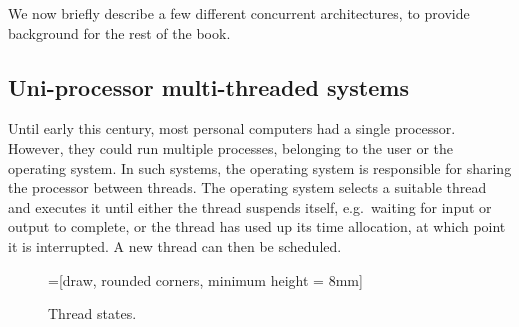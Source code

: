 We now briefly describe a few different concurrent architectures, to provide
background for the rest of the book.


\subsection{Uni-processor multi-threaded systems}

Until early this century, most personal computers had a single processor.
However, they could run multiple processes, belonging to the user or the
operating system.
%
In such systems, the operating system is responsible for sharing the processor
between threads.  The operating system selects a suitable thread and executes
it until either the thread suspends itself, e.g.~waiting for input or output
to complete, or the thread has used up its time allocation, at which point it
is interrupted.  A new thread can then be scheduled.


\begin{figure}
\begin{center}
=[draw, rounded corners, minimum height = 8mm]
\end{center}
\caption{Thread states.}
\label{fig:thread-states}
\end{figure}

